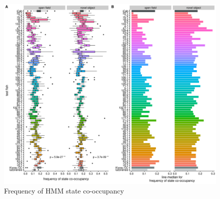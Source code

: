 \documentclass[
]{book}
\begin{document}
\begin{figure}
\includegraphics[width=1\linewidth]{figs/mikk_behaviour/0.08_15_cooc_box_all} \caption{Frequency of HMM state co-occupancy}\label{fig:F0-sge-cooc-box}
\end{figure}
\end{document}
